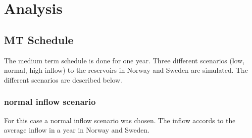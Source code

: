 \documentclass{article}
\begin{document}
\section{Analysis}
\subsection{MT Schedule}
The medium term schedule is done for one year. Three different scenarios (low, normal, high inflow) to the reservoirs in Norway and Sweden are simulated. The different scenarios are described below.
\subsubsection{normal inflow scenario}
For this case a normal inflow scenario was chosen. The inflow accords to the average inflow in a year in Norway and Sweden.
\end{document}
